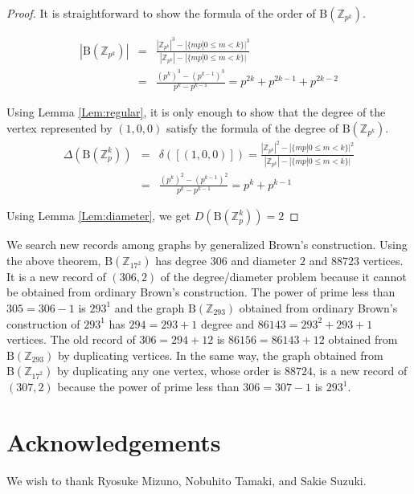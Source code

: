 \documentclass{article}
\newcommand{\Z}{\mathbb Z}
\newcommand{\B}{\mathrm{B}}
\begin{document}
\begin{proof}
It is straightforward to show the formula of the order of $\B(\Z_{p^k})$.

\begin{eqnarray*}
|\B(\Z_{p^k})| & = & \frac{|\Z_{p^k}|^3 - |\{ mp | 0 \leq m < k \}|^3}{|\Z_{p^k}|-|\{ mp | 0 \leq m < k \}|} \\ 
& = & \frac{(p^k)^3 - (p^{k-1})^3}{p^k-p^{k-1}} = p^{2k}+p^{2k-1}+p^{2k-2}
\end{eqnarray*}

Using Lemma \ref{Lem:regular}, it is only enough to show that the degree of the vertex represented by $(1,0,0)$ satisfy the formula of the degree of $\B(\Z_{p^k})$. 
\begin{eqnarray*}
\Delta(\B(\Z_p^k)) & = & \delta([(1,0,0)]) = \frac{|\Z_{p^k}|^2 - |\{ mp | 0 \leq m < k \}|^2 }{|\Z_{p^k}|-|\{ mp | 0 \leq m < k \}|} \\
& = & \frac{(p^k)^2 - (p^{k-1})^2}{p^k-p^{k-1}} = p^k + p^{k-1}
\end{eqnarray*}

Using Lemma \ref{Lem:diameter}, we get $D(\B(\Z_p^k)) = 2$

\end{proof}

We search new records among graphs by generalized Brown's construction.
Using the above theorem, $\B(\Z_{17^2})$ has degree $306$ and diameter $2$ and $88723$ vertices.
It is a new record of $(306,2)$ of the degree/diameter problem because it cannot be obtained from ordinary Brown's construction.
The power of prime less than $305=306 - 1$ is $293^1$ and the graph $\B(\Z_{293})$ obtained from ordinary Brown's construction of $293^1$ has $294=293+1$ degree and $86143=293^2+293+1$ vertices.
The old record of $306=294+12$ is $86156=86143+12$ obtained from $\B(\Z_{293})$ by duplicating vertices.
In the same way, the graph obtained from $\B(\Z_{17^2})$ by duplicating any one vertex, whose order is $88724$, is a new record of $(307,2)$ because the power of prime less than $306=307-1$ is $293^1$.

\section{Acknowledgements}
We wish to thank Ryosuke Mizuno, Nobuhito Tamaki, and Sakie Suzuki.



\end{document}
